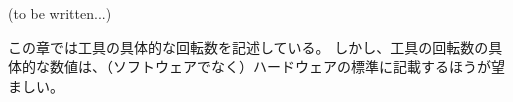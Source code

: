 


(to be written...)
\begin{hosoku}
この章では工具の具体的な回転数を記述している。
しかし、工具の回転数の具体的な数値は、（ソフトウェアでなく）ハードウェアの標準に記載するほうが望ましい。
\end{hosoku}

